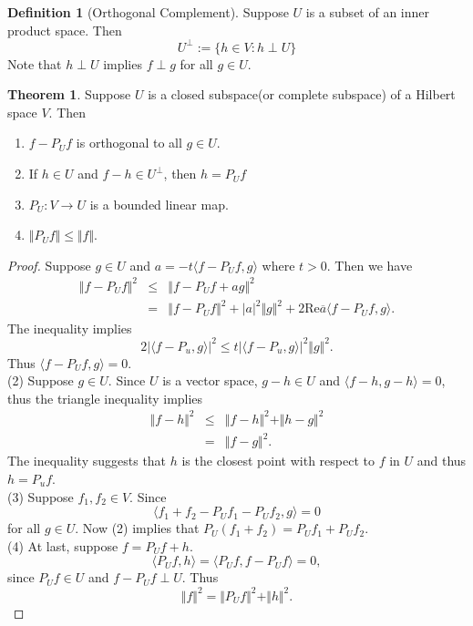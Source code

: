 \documentclass[12pt]{book}
\theoremstyle{definition}
\newtheorem{definition}{Definition}[chapter]
\newtheorem{theorem}{Theorem}[chapter]
\newcommand{\inner}[2]{{\langle #1,#2\rangle}}
\begin{document}
\begin{definition}[Orthogonal Complement]
Suppose $U$ is a subset of an inner product space. Then
$$
U^{\perp} := \{ h\in V:h \perp U\}
$$
Note that $h \perp U$ implies $f\perp g $ for all $g\in U$.
\end{definition}

\begin{theorem}
Suppose $U$ is a closed subspace(or complete subspace) of a Hilbert space $V$. Then \begin{enumerate}
	\item $f-P_Uf$ is orthogonal to all $g \in U$.
	\item If $h \in U$ and $f-h \in U^\perp$, then $h=P_Uf$
	\item $P_U: V \to U$ is a bounded linear map. 
	\item $\Vert P_Uf\Vert\leq \Vert f\Vert$.
\end{enumerate}	
\end{theorem}
\begin{proof}
Suppose $g\in U$ and $a=-t\inner{f-P_Uf}{g}$ where $t>0$. Then we have
\begin{eqnarray*}
	\Vert f-P_Uf\Vert^2 &\leq & \Vert f - P_Uf +a g\Vert^2 \\
	&=& \Vert f-P_Uf \Vert^2 + |a|^2\Vert g\Vert^2 + 2\mathrm{Re} \overline{a} \inner{f-P_Uf}{g}.
\end{eqnarray*}
The inequality implies 
$$
2|\inner{f-P_u}{g}|^2 \leq t |\inner{f-P_u}{g}|^2 \Vert g\Vert^2.
$$
Thus $\inner{f-P_Uf}{g}=0$. \\
(2) Suppose $g \in U$. Since $U$ is a vector space, $g-h \in U$ and $\inner{f-h}{g-h}=0$, thus the triangle inequality implies 
\begin{eqnarray*}
	\Vert f -h \Vert^2 &\leq&  \Vert f -h \Vert^2 + \Vert h-g \Vert^2 \\
	&=& \Vert f-g \Vert^2.
\end{eqnarray*}
The inequality suggests that $h$ is the closest point with respect to $f$ in $U$ and thus $h=P_uf$. \\
(3) Suppose $f_1,f_2 \in V$. Since
$$
\inner{f_1+f_2-P_Uf_1-P_Uf_2}{g}=0
$$ 
for all $g \in U$. Now (2) implies that $P_U(f_1+f_2)=P_Uf_1+P_Uf_2$. \\
(4) At last, suppose $f=P_Uf + h$.
$$
\inner{P_Uf}{h} = \inner{P_Uf}{f-P_Uf}=0,
$$
since $P_Uf\in U$ and $f-P_Uf \perp U$. Thus 
$$
\Vert f\Vert^2 = \Vert P_Uf \Vert^2 + \Vert h \Vert^2. 
$$
\end{proof}
\end{document}
